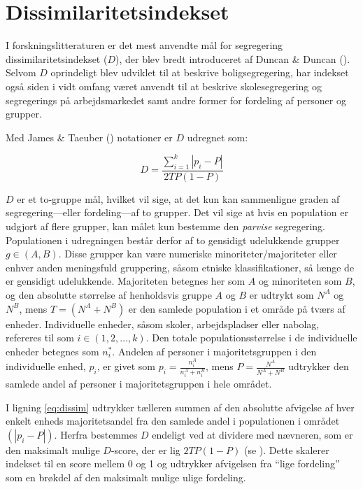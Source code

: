 \documentclass[
]{book}
\begin{document}
\section{Dissimilaritetsindekset}\label{dissimkap}

I forskningslitteraturen er det mest anvendte mål for segregering dissimilaritetsindekset (\(D\)), der blev bredt introduceret af Duncan \& Duncan (). Selvom \(D\) oprindeligt blev udviklet til at beskrive boligsegregering, har indekset også siden i vidt omfang været anvendt til at beskrive skolesegregering og segregerings på arbejdsmarkedet samt andre former for fordeling af personer og grupper.

Med James \& Taeuber () notationer er \(D\) udregnet som:

\begin{equation}
\label{eq:dissim}
D=\frac{ {\textstyle \sum_{i=1}^{k} \left | p_{i} - P \right | } }{ 2TP \left ( 1-P \right ) }
\end{equation}

\(D\) er et to-gruppe mål, hvilket vil sige, at det kun kan sammenligne graden af segregering---eller fordeling---af to grupper. Det vil sige at hvis en population er udgjort af flere grupper, kan målet kun bestemme den \emph{parvise} segregering. Populationen i udregningen består derfor af to gensidigt udelukkende grupper \(g \in (A, B)\). Disse grupper kan være numeriske minoriteter/majoriteter eller enhver anden meningsfuld gruppering, såsom etniske klassifikationer, så længe de er gensidigt udelukkende. Majoriteten betegnes her som \(A\) og minoriteten som \(B\), og den absolutte størrelse af henholdsvis gruppe \(A\) og \(B\) er udtrykt som \(N^{A}\) og \(N^{B}\), mens \(T=\left( N^{A} + N^{B} \right)\) er den samlede population i et område på tværs af enheder. Individuelle enheder, såsom skoler, arbejdspladser eller nabolag, refereres til som \(i \in (1, 2, \dots, k)\). Den totale populationsstørrelse i de individuelle enheder betegnes som \(n_{i}^{*}\). Andelen af personer i majoritetsgruppen i den individuelle enhed, \(p_{i}\), er givet som \(p_{i} = \frac{n_{i}^{A}}{n_{i}^{A} + n_{i}^{B}}\), mens \(P = \frac{N^{A}}{N^{A} + N^{B}}\) udtrykker den samlede andel af personer i majoritetsgruppen i hele området.

I ligning \eqref{eq:dissim} udtrykker tælleren summen af den absolutte afvigelse af hver enkelt enheds majoritetsandel fra den samlede andel i populationen i området \(\left( \left| p_{i} - P \right| \right)\). Herfra bestemmes \(D\) endeligt ved at dividere med nævneren, som er den maksimalt mulige \(D\)-score, der er lig \(2TP \left( 1-P \right)\) (se ). Dette skalerer indekset til en score mellem 0 og 1 og udtrykker afvigelsen fra ``lige fordeling'' som en brøkdel af den maksimalt mulige ulige fordeling.
\end{document}

